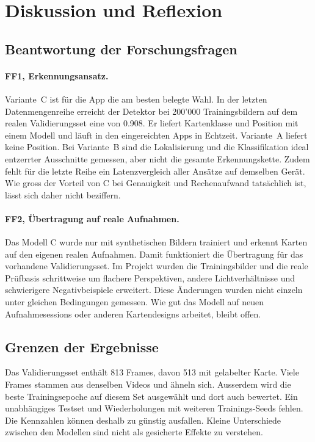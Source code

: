 \section{Diskussion und Reflexion}\label{sec:diskussion}

\subsection{Beantwortung der Forschungsfragen}\label{sec:antworten}

\paragraph{FF1, Erkennungsansatz.} Variante~C ist für die App die am besten
belegte Wahl. In der letzten Datenmengenreihe erreicht der Detektor bei
200'000 Trainingsbildern auf dem realen Validierungsset eine  von
0.908. Er liefert Kartenklasse und Position mit einem Modell und läuft in
den eingereichten Apps in Echtzeit. Variante~A liefert keine Position.
Bei Variante~B sind die Lokalisierung und die Klassifikation ideal
entzerrter Ausschnitte gemessen, aber nicht die gesamte Erkennungskette.
Zudem fehlt für die letzte Reihe ein Latenzvergleich aller Ansätze auf
demselben Gerät. Wie gross der Vorteil von C bei Genauigkeit und
Rechenaufwand tatsächlich ist, lässt sich daher nicht beziffern.

\paragraph{FF2, Übertragung auf reale Aufnahmen.} Das Modell C wurde nur
mit synthetischen Bildern trainiert und erkennt Karten auf den eigenen
realen Aufnahmen. Damit funktioniert die Übertragung für das vorhandene
Validierungsset. Im Projekt wurden die Trainingsbilder und die reale
Prüfbasis schrittweise um flachere Perspektiven, andere
Lichtverhältnisse und schwierigere Negativbeispiele erweitert. Diese
Änderungen wurden nicht einzeln unter gleichen Bedingungen gemessen.
Wie gut das Modell auf neuen Aufnahmesessions oder anderen
Kartendesigns arbeitet, bleibt offen.

\subsection{Grenzen der Ergebnisse}\label{sec:grenzen}

Das Validierungsset enthält 813 Frames, davon 513 mit gelabelter Karte.
Viele Frames stammen aus denselben Videos und ähneln sich. Ausserdem
wird die beste Trainingsepoche auf diesem Set ausgewählt und dort auch
bewertet. Ein unabhängiges Testset und Wiederholungen mit weiteren
Trainings-Seeds fehlen. Die Kennzahlen können deshalb zu günstig
ausfallen. Kleine Unterschiede zwischen den Modellen sind nicht als
gesicherte Effekte zu verstehen.

